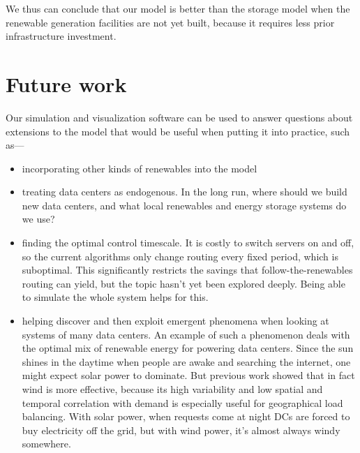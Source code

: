 \documentclass{acm_proc_article-sp}
\begin{document}
We thus can conclude that our model is better than the storage model when the renewable generation facilities are not yet built, because it requires less prior infrastructure investment.

\section{Future work}
Our simulation and visualization software can be used to answer questions about extensions to the model that would be useful when putting it into practice, such as—
\begin{itemize}
\item incorporating other kinds of renewables into the model
\item treating data centers as endogenous. In the long run, where should we build new data centers, and what local renewables and energy storage systems do we use?
\item finding the optimal control timescale. It is costly to switch servers on and off, so the current algorithms only change routing every fixed period, which is suboptimal. This significantly restricts the savings that follow-the-renewables routing can yield, but the topic hasn’t yet been explored deeply. Being able to simulate the whole system helps for this.
\item helping discover and then exploit emergent phenomena when looking at systems of many data centers. An example of such a phenomenon deals with the optimal mix of renewable energy for powering data centers. Since the sun shines in the daytime when people are awake and searching the internet, one might expect solar power to dominate. But previous work %
showed that in fact wind is more effective, because its high variability and low spatial and temporal correlation with demand is especially useful for geographical load balancing. With solar power, when requests come at night DCs are forced to buy electricity off the grid, but with wind power, it’s almost always windy somewhere.
\end{itemize}

\printbibliography
\end{document}
